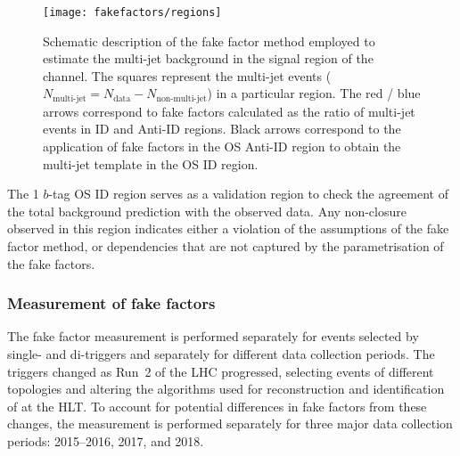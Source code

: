 \begin{figure}[htbp]
  \centering

  \texttt{[image: fakefactors/regions]}

  \caption{Schematic description of the fake factor method employed to
    estimate the multi-jet background in the signal region of the
    \hadhad channel. The squares represent the multi-jet events
    ($N_\text{multi-jet} = N_\text{data} - N_\text{non-multi-jet}$) in
    a particular region. The red / blue arrows correspond to fake
    factors calculated as the ratio of multi-jet events in ID and
    Anti-ID regions. Black arrows correspond to the application of
    fake factors in the OS Anti-ID region to obtain the multi-jet
    template in the OS ID region.}
  \label{fig:fakefactor_regions}
\end{figure}

The 1 $b$-tag OS ID region serves as a validation region to check the
agreement of the total background prediction with the observed
data. Any non-closure observed in this region indicates either a
violation of the assumptions of the fake factor method, or
dependencies that are not captured by the parametrisation of the fake
factors.



\subsubsection{Measurement of fake factors}

The fake factor measurement is performed separately for events
selected by single- and di-\tauhadvis triggers and separately for
different data collection periods. The \tauhadvis triggers changed as
Run~2 of the LHC progressed, selecting events of different topologies
and altering the algorithms used for reconstruction and identification
of \tauhadvis at the HLT. To account for potential differences in fake
factors from these changes, the measurement is performed separately
for three major data collection periods: 2015--2016, 2017, and 2018.

